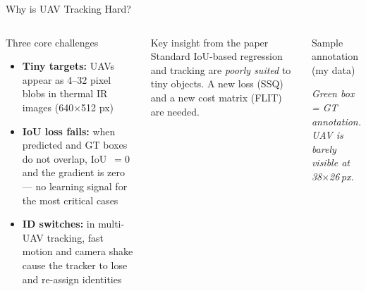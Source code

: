 \documentclass[aspectratio=169, 10pt]{beamer}
\begin{document}
\begin{frame}{Why is UAV Tracking Hard?}

  \begin{columns}[T]

    \begin{block}{Three core challenges}
      \begin{itemize}
        \item \textbf{Tiny targets:} UAVs appear as 4--32 pixel blobs in
              thermal IR images (640$\times$512 px)
        \item \textbf{IoU loss fails:} when predicted and GT boxes do not
              overlap, IoU~$= 0$ and the gradient is zero — no learning
              signal for the most critical cases
        \item \textbf{ID switches:} in multi-UAV tracking, fast motion and
              camera shake cause the tracker to lose and re-assign identities
      \end{itemize}
    \end{block}

    \vspace{0.5em}
    \begin{alertblock}{Key insight from the paper}
      Standard IoU-based regression and tracking are \emph{poorly suited}
      to tiny objects.  A new loss (SSQ) and a new cost matrix (FLIT) are
      needed.
    \end{alertblock}

    \begin{block}{Sample annotation (my data)}
      \centering
      \vspace{0.3em}
      \vspace{0.2em}

      \small\textit{Green box = GT annotation.\\
      UAV is barely visible at 38$\times$26\,px.}
    \end{block}

  \end{columns}
\end{frame}
\end{document}
